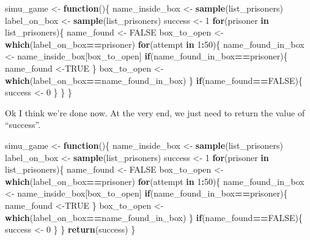 \documentclass[]{book}
\newenvironment{Shaded}{\begin{snugshade}}{\end{snugshade}}
\newcommand{\ControlFlowTok}[1]{\textcolor[rgb]{0.13,0.29,0.53}{\textbf{#1}}}
\newcommand{\DecValTok}[1]{\textcolor[rgb]{0.00,0.00,0.81}{#1}}
\newcommand{\KeywordTok}[1]{\textcolor[rgb]{0.13,0.29,0.53}{\textbf{#1}}}
\newcommand{\NormalTok}[1]{#1}
\newcommand{\OperatorTok}[1]{\textcolor[rgb]{0.81,0.36,0.00}{\textbf{#1}}}
\newcommand{\OtherTok}[1]{\textcolor[rgb]{0.56,0.35,0.01}{#1}}
\newcommand{\StringTok}[1]{\textcolor[rgb]{0.31,0.60,0.02}{#1}}
\begin{document}
\begin{Shaded}
\begin{Highlighting}[]
\NormalTok{simu_game <-}\StringTok{ }\ControlFlowTok{function}\NormalTok{()\{}
\NormalTok{  name_inside_box <-}\StringTok{ }\KeywordTok{sample}\NormalTok{(list_prisoners)}
\NormalTok{  label_on_box <-}\StringTok{ }\KeywordTok{sample}\NormalTok{(list_prisoners)}
\NormalTok{  success <-}\StringTok{ }\DecValTok{1}
  \ControlFlowTok{for}\NormalTok{(prisoner }\ControlFlowTok{in}\NormalTok{ list_prisoners)\{}
\NormalTok{    name_found <-}\StringTok{ }\OtherTok{FALSE}
\NormalTok{    box_to_open <-}\StringTok{ }\KeywordTok{which}\NormalTok{(label_on_box}\OperatorTok{==}\NormalTok{prisoner)}
    \ControlFlowTok{for}\NormalTok{(attempt }\ControlFlowTok{in} \DecValTok{1}\OperatorTok{:}\DecValTok{50}\NormalTok{)\{}
\NormalTok{      name_found_in_box <-}\StringTok{ }\NormalTok{name_inside_box[box_to_open]}
      \ControlFlowTok{if}\NormalTok{(name_found_in_box}\OperatorTok{==}\NormalTok{prisoner)\{}
\NormalTok{        name_found <-}\OtherTok{TRUE}
\NormalTok{      \}}
\NormalTok{      box_to_open <-}\StringTok{ }\KeywordTok{which}\NormalTok{(label_on_box}\OperatorTok{==}\NormalTok{name_found_in_box) }
\NormalTok{    \}}
    \ControlFlowTok{if}\NormalTok{(name_found}\OperatorTok{==}\OtherTok{FALSE}\NormalTok{)\{}
\NormalTok{      success <-}\StringTok{ }\DecValTok{0}
\NormalTok{    \}}
\NormalTok{  \}}
\NormalTok{\}}
\end{Highlighting}
\end{Shaded}

Ok I think we're done now. At the very end, we just need to return the value of ``success''.

\begin{Shaded}
\begin{Highlighting}[]
\NormalTok{simu_game <-}\StringTok{ }\ControlFlowTok{function}\NormalTok{()\{}
\NormalTok{  name_inside_box <-}\StringTok{ }\KeywordTok{sample}\NormalTok{(list_prisoners)}
\NormalTok{  label_on_box <-}\StringTok{ }\KeywordTok{sample}\NormalTok{(list_prisoners)}
\NormalTok{  success <-}\StringTok{ }\DecValTok{1}
  \ControlFlowTok{for}\NormalTok{(prisoner }\ControlFlowTok{in}\NormalTok{ list_prisoners)\{}
\NormalTok{    name_found <-}\StringTok{ }\OtherTok{FALSE}
\NormalTok{    box_to_open <-}\StringTok{ }\KeywordTok{which}\NormalTok{(label_on_box}\OperatorTok{==}\NormalTok{prisoner)}
    \ControlFlowTok{for}\NormalTok{(attempt }\ControlFlowTok{in} \DecValTok{1}\OperatorTok{:}\DecValTok{50}\NormalTok{)\{}
\NormalTok{      name_found_in_box <-}\StringTok{ }\NormalTok{name_inside_box[box_to_open]}
      \ControlFlowTok{if}\NormalTok{(name_found_in_box}\OperatorTok{==}\NormalTok{prisoner)\{}
\NormalTok{        name_found <-}\OtherTok{TRUE}
\NormalTok{      \}}
\NormalTok{      box_to_open <-}\StringTok{ }\KeywordTok{which}\NormalTok{(label_on_box}\OperatorTok{==}\NormalTok{name_found_in_box) }
\NormalTok{    \}}
    \ControlFlowTok{if}\NormalTok{(name_found}\OperatorTok{==}\OtherTok{FALSE}\NormalTok{)\{}
\NormalTok{      success <-}\StringTok{ }\DecValTok{0}
\NormalTok{    \}}
\NormalTok{  \}}
  \KeywordTok{return}\NormalTok{(success)}
\NormalTok{\}}
\end{Highlighting}
\end{Shaded}
\end{document}
